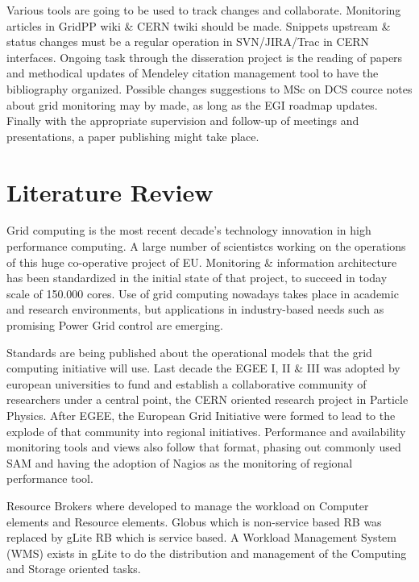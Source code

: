 \documentclass[a4paper,12pt,oneside]{book}
\begin{document}
Various tools are going to be used to track changes and collaborate. Monitoring
articles in GridPP wiki \& CERN twiki should be made. Snippets upstream \&
status changes must be a regular operation in SVN/JIRA/Trac in CERN interfaces.
Ongoing task through the disseration project is the reading of papers and
methodical updates of Mendeley citation management tool to have the bibliography
organized. Possible changes suggestions to MSc on DCS cource notes about grid
monitoring may by made, as long as the EGI roadmap updates. Finally with the
appropriate supervision and follow-up of meetings and presentations, a paper publishing
might take place.

\section{Literature Review}

Grid computing \cite{li2005grid} is the most recent decade's technology
innovation in high performance computing. A large number of scientistcs working
on the operations of this huge co-operative project of EU. Monitoring \&
information architecture \cite{fisher2002datagrid} has been standardized in the
initial state of that project, to succeed in today scale of 150.000 cores. Use
of grid computing nowadays takes place in academic and research environments,
but applications in industry-based needs such as promising Power Grid control
\cite{Taylor2006} are emerging.

Standards are being published about the operational models that the grid
computing initiative will use. Last decade the EGEE I, II \& III was adopted by
european universities to fund and establish a collaborative community of
researchers under a central point, the CERN oriented research project in
Particle Physics. After EGEE, the European Grid Initiative were formed to lead
to the explode of that community into regional initiatives. Performance
and availability monitoring tools and views also follow that format, phasing out
commonly used SAM \cite{egee3dsa122} and having the adoption of Nagios as the
monitoring of regional performance tool.

Resource Brokers \cite{Kertesz06ataxonomy} where developed to manage the
workload on Computer elements and Resource elements. Globus which is 
non-service based RB was replaced by gLite RB which is service based. A Workload
Management System (WMS) exists in gLite to do the distribution and management of
the Computing and Storage oriented tasks.
\end{document}
